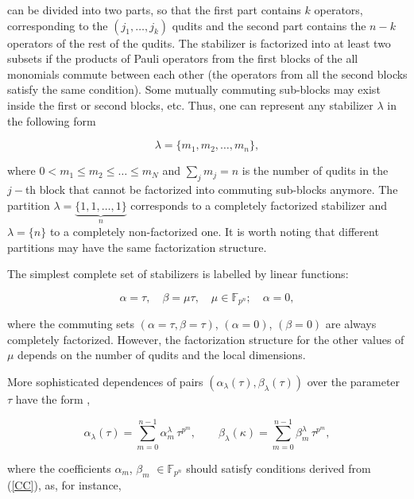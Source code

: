 \documentclass[quantumrep,article,submit,pdftex,moreauthors]{Definitions/mdpi}
\begin{document}
can be divided into two parts, so that the first part contains $k$ operators,
corresponding to the $(j_{1},\ldots,j_{k})$ qudits and the second part contains
the $n-k$ operators of the rest of the qudits. The stabilizer is factorized into
at least two subsets if the products of Pauli operators from the first blocks of
the all monomials commute between each other (the operators from all the second
blocks satisfy the same condition).  Some mutually commuting sub-blocks may
exist inside the first or second blocks, etc. Thus, one can represent any
stabilizer $\lambda$ in the following form

\begin{equation}
  \lambda = \{m_{1},m_{2},\ldots,m_{n}\},
  \label{curve_part}
\end{equation}

where $0<m_{1}\leq m_{2} \leq \ldots \leq m_{N}$ and $\sum_{j}m_{j}=n$ is the
number of qudits in the $j-$th block that cannot be factorized into commuting
sub-blocks anymore. The partition $\lambda =\underbrace{\{1,1,\ldots,1\}}_{n}$
corresponds to a completely factorized stabilizer and $\lambda=\{n\}$ to a
completely non-factorized one. It is worth noting that different partitions
may
 have the same factorization structure.

The simplest complete set of stabilizers is labelled by linear functions:

\begin{equation}
  \alpha = \tau, \quad \beta = \mu \tau, \quad \mu \in \mathbb{F}_{p^{n}};
  \quad \alpha = 0,
  \label{rays}
\end{equation}

where the commuting sets $\left(\alpha = \tau, \beta = \tau \right)$,
$\left(\alpha = 0\right)$, $\left(\beta = 0\right)$ are always completely
factorized.  However, the factorization structure for the other values of
$\mu$
 depends on the number of qudits and the local dimensions.

More sophisticated dependences of pairs
$\left(\alpha_{\lambda}(\tau),\beta_{\lambda }(\tau)\right)$ over the parameter
$\tau$ have the form \cite{GS2,JPA09},

\begin{equation}
  \alpha_{\lambda }(\tau)
  = \sum_{m=0}^{n-1} \alpha_{m}^{\lambda } \, \tau^{p^{m}},
  \qquad \beta_{\lambda}(\kappa)
  = \sum_{m=0}^{n-1}\beta_{m}^{\lambda} \, \tau^{p^{m}},
  \label{curve1}
\end{equation}

where the coefficients $\alpha_{m}$, $\beta_{m}$ $\in \mathbb{F}_{p^{n}}$
should satisfy conditions derived from (\ref{CC}), as, for instance,
\end{document}
